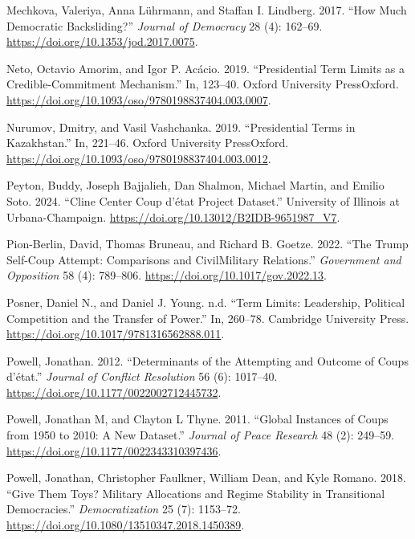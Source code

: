 \documentclass[
  12pt,
]{report}
\newlength{\cslhangindent}
\newenvironment{CSLReferences}[2] %
 {\begin{list}{}{%
  \setlength{\itemindent}{0pt}
  \setlength{\leftmargin}{0pt}
  \setlength{\parsep}{0pt}
  \ifodd #1
   \setlength{\leftmargin}{\cslhangindent}
   \setlength{\itemindent}{-1\cslhangindent}
  \fi
  \setlength{\itemsep}{#2\baselineskip}}}
 {\end{list}}
\begin{document}
\begin{CSLReferences}{1}{0}
Mechkova, Valeriya, Anna Lührmann, and Staffan I. Lindberg. 2017. {``How
Much Democratic Backsliding?''} \emph{Journal of Democracy} 28 (4):
162--69. \url{https://doi.org/10.1353/jod.2017.0075}.

Neto, Octavio Amorim, and Igor P. Acácio. 2019. {``Presidential Term
Limits as a Credible-Commitment Mechanism.''} In, 123--40. Oxford
University PressOxford.
\url{https://doi.org/10.1093/oso/9780198837404.003.0007}.

Nurumov, Dmitry, and Vasil Vashchanka. 2019. {``Presidential Terms in
Kazakhstan.''} In, 221--46. Oxford University PressOxford.
\url{https://doi.org/10.1093/oso/9780198837404.003.0012}.

Peyton, Buddy, Joseph Bajjalieh, Dan Shalmon, Michael Martin, and Emilio
Soto. 2024. {``Cline Center Coup d{'}état Project Dataset.''} University
of Illinois at Urbana-Champaign.
\url{https://doi.org/10.13012/B2IDB-9651987_V7}.

Pion-Berlin, David, Thomas Bruneau, and Richard B. Goetze. 2022. {``The
Trump Self-Coup Attempt: Comparisons and Civil{\textendash}Military
Relations.''} \emph{Government and Opposition} 58 (4): 789--806.
\url{https://doi.org/10.1017/gov.2022.13}.

Posner, Daniel N., and Daniel J. Young. n.d. {``Term Limits: Leadership,
Political Competition and the Transfer of Power.''} In, 260--78.
Cambridge University Press.
\url{https://doi.org/10.1017/9781316562888.011}.

Powell, Jonathan. 2012. {``Determinants of the Attempting and Outcome of
Coups d{'}état.''} \emph{Journal of Conflict Resolution} 56 (6):
1017--40. \url{https://doi.org/10.1177/0022002712445732}.

Powell, Jonathan M, and Clayton L Thyne. 2011. {``Global Instances of
Coups from 1950 to 2010: A New Dataset.''} \emph{Journal of Peace
Research} 48 (2): 249--59.
\url{https://doi.org/10.1177/0022343310397436}.

Powell, Jonathan, Christopher Faulkner, William Dean, and Kyle Romano.
2018. {``Give Them Toys? Military Allocations and Regime Stability in
Transitional Democracies.''} \emph{Democratization} 25 (7): 1153--72.
\url{https://doi.org/10.1080/13510347.2018.1450389}.


\end{CSLReferences}
\end{document}
